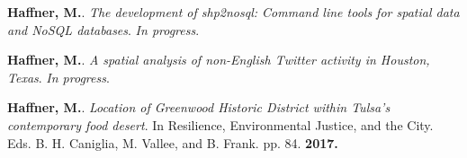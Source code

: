 \begin{cventries}
   \cventry
      {}
      {}
      {}
      {}
      {
        \begin{cvitems}
          \vspace{-4mm}
        \item {\textbf{Haffner, M.}.
            \textit{The development of shp2nosql: Command line tools for spatial data and NoSQL databases}. \textit{In progress}.} \\
          \vspace{-2mm}
        \item
          {\textbf{Haffner, M.}.
            \textit{A spatial analysis of non-English Twitter activity in Houston, Texas}. \textit{In progress}.} \\
          \vspace{-2mm}
        \end{cvitems}
    }
\end{cventries}



\begin{cventries}
   \cventry
      {}
      {}
      {}
      {}
      {
        \begin{cvitems}
          \vspace{-4mm}
        \item {\textbf{Haffner, M.}.
            \textit{Location of Greenwood Historic District within Tulsa's
              contemporary food desert}. In Resilience, Environmental
              Justice, and the City. Eds. B. H. Caniglia, M. Vallee, and B.
            Frank. pp. 84. \textbf{2017.}} \\
          \vspace{-2mm}
        \end{cvitems}
    }
\end{cventries}